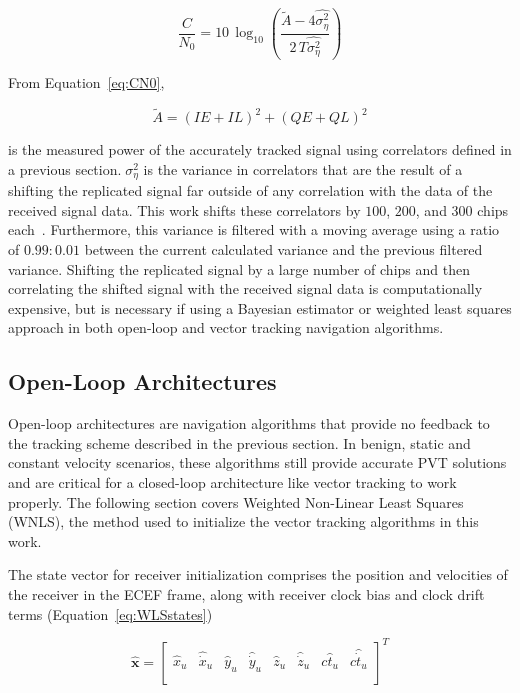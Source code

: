 \begin{equation}\label{eq:CN0}
    \frac{C}{N_0} = 10\,\log_{10} {\left(\frac{\tilde{A} - 4\hat{\sigma_{\eta}^2}}{2\,T\hat{\sigma_{\eta}^2}}\right)}
\end{equation}

From Equation~\ref{eq:CN0},

\begin{equation}\label{eq:ampitude}
    \tilde{A} = {\left(IE +IL\right)}^2 + {\left(QE + QL\right)}^2
\end{equation}

is the measured power of the accurately tracked signal using correlators defined in a previous section.\( \; \sigma_{\eta}^2\) is the variance in correlators that are the result of a shifting the replicated signal far outside of any correlation with the data of the received signal data. This work shifts these correlators by \(100\), \(200\), and \(300\) chips each~\cite{wattsGPSGLONASSL12019}. Furthermore, this variance is filtered with a moving average using a ratio of \(0.99:0.01\) between the current calculated variance and the previous filtered variance. Shifting the replicated signal by a large number of chips and then correlating the shifted signal with the received signal data is computationally expensive, but is necessary if using a Bayesian estimator or weighted least squares approach in both open-loop and vector tracking navigation algorithms.


\subsection{\textbf{Open-Loop Architectures}}
Open-loop architectures are navigation algorithms that provide no feedback to the tracking scheme described in the previous section. In benign, static and constant velocity scenarios, these algorithms still provide accurate PVT solutions and are critical for a closed-loop architecture like vector tracking to work properly. The following section covers Weighted Non-Linear Least Squares (WNLS), the method used to initialize the vector tracking algorithms in this work.

The state vector for receiver initialization comprises the position and velocities of the receiver in the ECEF frame, along with receiver clock bias and clock drift terms (Equation~\ref{eq:WLSstates})

\begin{equation}\label{eq:WLSstates}
    \hat{\mathbf{x}} =
    \begin{bmatrix}
        \hat{x}_u & \hat{\dot{x}}_u & \hat{y}_u & \hat{\dot{y}}_u & \hat{z}_u & \hat{\dot{z}}_u & c\hat{t}_u & c\hat{\dot{t}}_u \\
    \end{bmatrix}^T
\end{equation}


